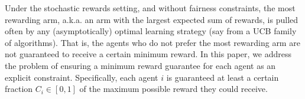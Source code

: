 Under the stochastic rewards setting, and without fairness constraints,  the most rewarding arm, a.k.a. an arm with the largest expected sum of rewards,  is pulled often by  any  (asymptotically) optimal learning strategy (say from a UCB family of algorithms).  That is, the agents who do not prefer the most rewarding arm are not guaranteed to receive a certain minimum reward. 
\fi 
In this paper, we address the problem of ensuring a minimum reward guarantee for each agent as an explicit constraint. Specifically, each agent \( i \) is guaranteed at least a certain fraction \( C_i \in [0,1] \) of the maximum possible reward they could receive. %

